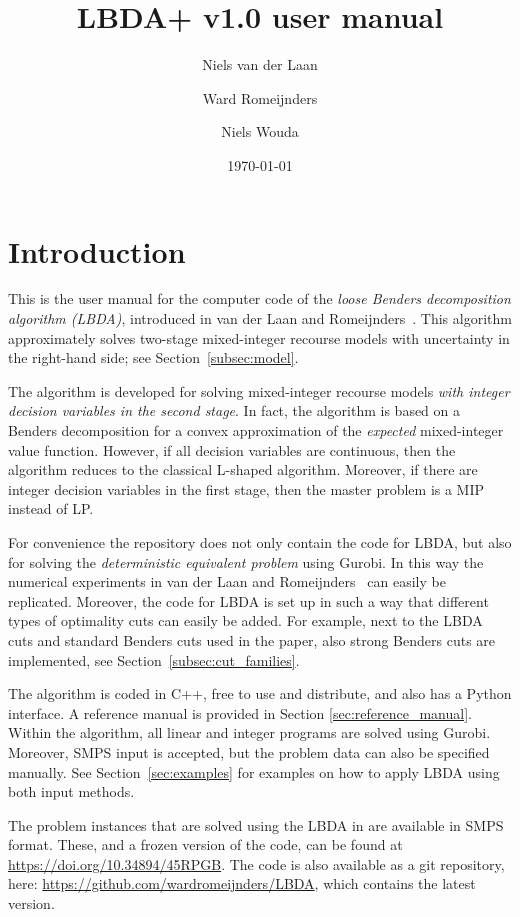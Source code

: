 \documentclass[12pt, english]{article}
\title{LBDA+ v1.0 user manual}
\author{
	Niels van der Laan
	\and
	Ward Romeijnders
	\and
	Niels Wouda
}
\date{\today}
\begin{document}
	
\maketitle
\tableofcontents

\clearpage

\section{Introduction}
\label{sec:introduction}
This is the user manual for the computer code of the \emph{loose Benders decomposition algorithm (LBDA)}, introduced in van der Laan and Romeijnders~\cite{vanderLaan2020}. This algorithm approximately solves two-stage mixed-integer recourse models with uncertainty in the right-hand side; see Section~\ref{subsec:model}. 

The algorithm is developed for solving mixed-integer recourse models \emph{with integer decision variables in the second stage}. In fact, the algorithm is based on a Benders decomposition for a convex approximation of the \emph{expected} mixed-integer value function. However, if all decision variables are continuous, then the algorithm reduces to the classical L-shaped algorithm. Moreover, if there are integer decision variables in the first stage, then the master problem is a MIP instead of LP.

For convenience the repository does not only contain the code for LBDA, but also for solving the \emph{deterministic equivalent problem} using Gurobi. In this way the numerical experiments in van der Laan and Romeijnders~\cite{vanderLaan2020} can easily be replicated. Moreover, the code for LBDA is set up in such a way that different types of optimality cuts can easily be added. For example, next to the LBDA cuts and standard Benders cuts used in the paper, also strong Benders cuts are implemented, see Section~\ref{subsec:cut_families}.

The algorithm is coded in C++, free to use and distribute, and also has a Python interface. A reference manual is provided in Section \ref{sec:reference_manual}. Within the algorithm, all linear and integer programs are solved using Gurobi. Moreover, SMPS input is accepted, but the problem data can also be specified manually. See Section~\ref{sec:examples} for examples on how to apply LBDA using both input methods. 

The problem instances that are solved using the LBDA in \cite{vanderLaan2020} are available in SMPS format. These, and a frozen version of the code, can be found at \url{https://doi.org/10.34894/45RPGB}. The code is also available as a git repository, here: \url{https://github.com/wardromeijnders/LBDA}, which contains the latest version.
\end{document}
